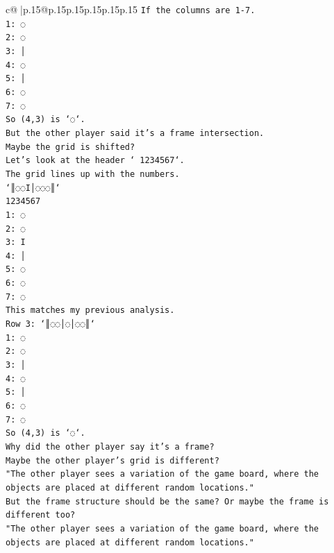 \documentclass{article}
\begin{document}
{\begin{supertabular}{c@{$\;$}|p{.15\linewidth}@{}p{.15\linewidth}p{.15\linewidth}p{.15\linewidth}p{.15\linewidth}p{.15\linewidth}}
{{{\texttt{If the columns are 1{-}7.} \\
\texttt{1: ◌} \\
\texttt{2: ◌} \\
\texttt{3: │} \\
\texttt{4: ◌} \\
\texttt{5: │} \\
\texttt{6: ◌} \\
\texttt{7: ◌} \\
\texttt{So (4,3) is `◌`.} \\
\texttt{But the other player said it's a frame intersection.} \\
\texttt{Maybe the grid is shifted?} \\
\texttt{Let's look at the header ` 1234567`.} \\
\texttt{The grid lines up with the numbers.} \\
\texttt{`║◌◌I│◌◌◌║`} \\
\texttt{1234567} \\
\texttt{1: ◌} \\
\texttt{2: ◌} \\
\texttt{3: I} \\
\texttt{4: │} \\
\texttt{5: ◌} \\
\texttt{6: ◌} \\
\texttt{7: ◌} \\
\texttt{This matches my previous analysis.} \\
\texttt{Row 3: `║◌◌│◌│◌◌║`} \\
\texttt{1: ◌} \\
\texttt{2: ◌} \\
\texttt{3: │} \\
\texttt{4: ◌} \\
\texttt{5: │} \\
\texttt{6: ◌} \\
\texttt{7: ◌} \\
\texttt{So (4,3) is `◌`.} \\
\texttt{Why did the other player say it's a frame?} \\
\texttt{Maybe the other player's grid is different?} \\
\texttt{"The other player sees a variation of the game board, where the objects are placed at different random locations."} \\
\texttt{But the frame structure should be the same? Or maybe the frame is different too?} \\
\texttt{"The other player sees a variation of the game board, where the objects are placed at different random locations."} \\
}}}
\end{supertabular}}
\end{document}
